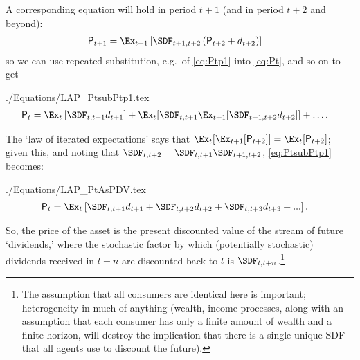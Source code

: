 \documentclass{\handout}
\begin{document}
A corresponding equation will hold in period $t+1$ (and in period $t+2$ and beyond):
\begin{equation}\begin{gathered}\begin{aligned}
 \Price_{t+1} & =  \Ex_{t+1}\left[\SDF_{t+1,t+2}\left({\Price}_{t+2}+\dvdnd_{t+2}\right)\right] \label{eq:Ptp1}
\end{aligned}\end{gathered}\end{equation}
so we can use repeated substitution, e.g.\ of \eqref{eq:Ptp1} into \eqref{eq:Pt}, and so on to get
\begin{verbatimwrite}{./Equations/LAP_PtsubPtp1.tex}
\begin{equation}\begin{gathered}\begin{aligned}
 \Price_{t} & =  \Ex_{t}\left[\SDF_{t,t+1}\dvdnd_{t+1}\right]+\Ex_{t}[\SDF_{t,t+1}\Ex_{t+1}[\SDF_{t+1,t+2}\dvdnd_{t+2}]]+ \ldots \label{eq:PtsubPtp1}
.
\end{aligned}\end{gathered}\end{equation}
\end{verbatimwrite}


The `law of iterated expectations' says that
$\Ex_{t}[\Ex_{t+1}[{\Price}_{t+2}]] = \Ex_{t}[{\Price}_{t+2}]$;
given this, and noting that $\SDF_{t,t+2} = \SDF_{t,t+1}\SDF_{t+1,t+2}$, \eqref{eq:PtsubPtp1} becomes:
\begin{verbatimwrite}{./Equations/LAP_PtAsPDV.tex}
\begin{equation}\begin{gathered}\begin{aligned}
 \Price_{t} & =  \Ex_{t}\left[\SDF_{t,t+1}\dvdnd_{t+1}+\SDF_{t,t+2}\dvdnd_{t+2}+\SDF_{t,t+3}\dvdnd_{t+3}+...\right] . \label{eq:PtAsPDV}
\end{aligned}\end{gathered}\end{equation}
\end{verbatimwrite}


So, the price of the asset is the present discounted value of the stream of future `dividends,' where the stochastic factor by which (potentially stochastic) dividends received in $t+n$ are discounted back to $t$ is $\SDF_{t,t+n}$.\footnote{The assumption that all consumers are identical here is important; heterogeneity in much of anything (wealth, income processes, along with an assumption that each consumer has only a finite amount of wealth and a finite horizon, will destroy the implication that there is a single unique SDF that all agents use to discount the future).}
\end{document}

